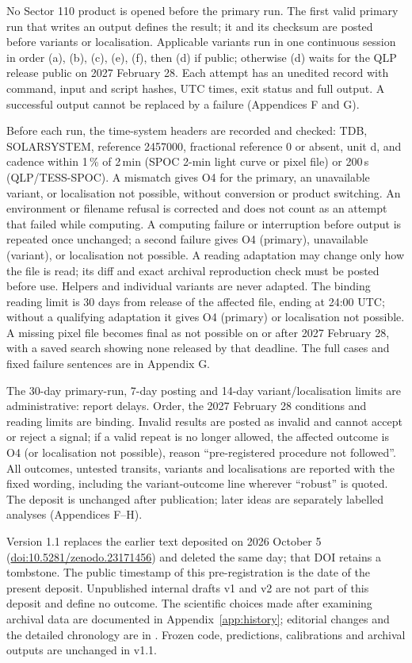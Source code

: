  No Sector 110 product is opened before the primary run. The first valid
primary run that writes an output defines the result; it and its checksum are posted before variants or localisation.
Applicable variants run in one continuous session in order (a), (b), (c), (e), (f), then (d) if public; otherwise (d) waits for the
QLP release public on 2027 February 28. Each attempt has an unedited record with command, input and script hashes,
UTC times, exit status and full output. A successful output cannot be replaced by a failure (Appendices F and G).

Before each run, the time-system headers are recorded and checked: TDB, SOLARSYSTEM, reference 2457000, fractional
reference 0 or absent, unit d, and cadence within 1\,\% of 2\,min (SPOC 2-min light curve or pixel file) or 200\,s (QLP/TESS-SPOC). A mismatch gives O4
for the primary, an unavailable variant, or localisation not possible, without conversion or product switching.
An environment or filename refusal is corrected and does not count as an attempt that failed while computing.
A computing failure or interruption before output is repeated once unchanged; a second failure gives O4 (primary), unavailable
(variant), or localisation not possible. A reading adaptation may change only how the file is read; its diff and
exact archival reproduction check must be posted before use. Helpers and individual variants are never adapted.
The binding reading limit is 30 days from release of the affected file, ending at 24:00 UTC; without a qualifying
adaptation it gives O4 (primary) or localisation not possible. A missing pixel file becomes final as not possible on or after 2027 February 28, with a saved search
showing none released by that deadline. The full cases and fixed failure sentences are in Appendix G.

The 30-day primary-run, 7-day posting and 14-day variant/localisation limits are administrative: report delays.
Order, the 2027 February 28 conditions and reading limits are binding. Invalid results are posted as invalid and
cannot accept or reject a signal; if a valid repeat is no longer allowed, the affected outcome is O4 (or localisation
not possible), reason ``pre-registered procedure not followed''. All outcomes, untested transits, variants and
localisations are reported with the fixed wording, including the variant-outcome line wherever ``robust'' is quoted.
The deposit is unchanged after publication; later ideas are separately labelled analyses (Appendices F--H).

 Version 1.1 replaces the earlier text deposited on 2026 October 5
(\href{https://doi.org/10.5281/zenodo.23171456}{doi:10.5281/zenodo.23171456}) and deleted the same day; that DOI retains a tombstone.
The public timestamp of this pre-registration is the date of the present deposit.
Unpublished internal drafts v1 and v2 are not part of this deposit and define no outcome.
The scientific choices made after examining archival data are documented in Appendix~\ref{app:history};
editorial changes and the detailed chronology are in . Frozen code, predictions,
calibrations and archival outputs are unchanged in v1.1.
